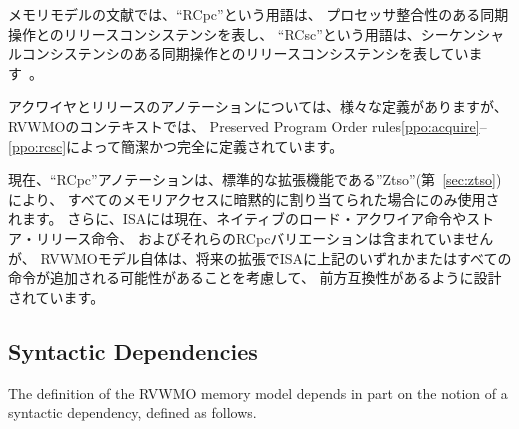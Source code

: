 \begin{commentary}
\begin{comment}
  In the memory model literature, the term ``RCpc'' stands for release consistency with processor-consistent synchronization operations, and the term ``RCsc'' stands for release consistency with sequentially-consistent synchronization operations~\cite{Gharachorloo90memoryconsistency}.
\end{comment}
  メモリモデルの文献では、``RCpc''という用語は、
プロセッサ整合性のある同期操作とのリリースコンシステンシを表し、
``RCsc''という用語は、シーケンシャルコンシステンシのある同期操作とのリリースコンシステンシを表しています~\cite{Gharachorloo90memoryconsistency}。

\begin{comment}
  While there are many different definitions for acquire and release annotations in the literature, in the context of RVWMO these terms are concisely and completely defined by Preserved Program Order rules \ref{ppo:acquire}--\ref{ppo:rcsc}.
\end{comment}
  アクワイヤとリリースのアノテーションについては、様々な定義がありますが、RVWMOのコンテキストでは、
Preserved Program Order rules\ref{ppo:acquire}--\ref{ppo:rcsc}によって簡潔かつ完全に定義されています。

\begin{comment}
  ``RCpc'' annotations are currently only used when implicitly assigned to every memory access per the standard extension ``Ztso'' (Chapter~\ref{sec:ztso}).  Furthermore, although the ISA does not currently contain native load-acquire or store-release instructions, nor RCpc variants thereof, the RVWMO model itself is designed to be forwards-compatible with the potential addition of any or all of the above into the ISA in a future extension.
\end{comment}
  現在、``RCpc''アノテーションは、標準的な拡張機能である''Ztso''(第~\ref{sec:ztso})により、
すべてのメモリアクセスに暗黙的に割り当てられた場合にのみ使用されます。 
さらに、ISAには現在、ネイティブのロード・アクワイア命令やストア・リリース命令、
およびそれらのRCpcバリエーションは含まれていませんが、
RVWMOモデル自体は、将来の拡張でISAに上記のいずれかまたはすべての命令が追加される可能性があることを考慮して、
前方互換性があるように設計されています。
\end{commentary}

\subsection*{Syntactic Dependencies}
\label{sec:memorymodel:dependencies}
The definition of the RVWMO memory model depends in part on the notion of a syntactic dependency, defined as follows.

